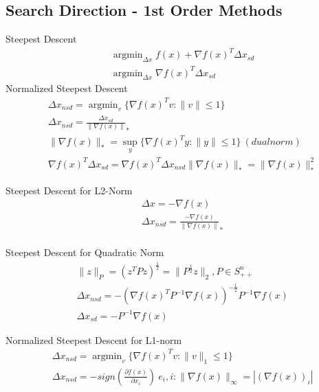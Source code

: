 \documentclass[8pt]{report}
\DeclareMathOperator*{\argmin}{argmin}
\newcommand{\norm}[1]{\|#1\|}
\newcommand{\set}[1]{\{#1\}}
\begin{document}
\begin{multicols*}{2}
  \vfill\null
  \columnbreak
  
  \subsection{Search Direction - 1st Order Methods}
  Steepest Descent
  \begin{align*}
    &\argmin_{\Delta x} f(x) + \nabla f(x)^T \Delta x_{sd}\\
    &\argmin_{\Delta x} \nabla f(x)^T \Delta x_{sd}
  \end{align*}
  Normalized Steepest Descent
  \begin{align*}
    &\Delta x_{nsd} = \argmin_{v} \set{ \nabla f(x)^T v : \norm{v} \leq 1 }\\
    &\Delta x_{nsd} = \frac{\Delta x_{sd}}{\norm{\nabla f(x)}}_*\\
    &\norm{\nabla f(x)}_* = \sup_y \{\nabla f(x)^T y: \|y\| \leq 1 \}\ (dual norm)\\
    &\nabla f(x)^T \Delta x_{sd} = \nabla f(x)^T \Delta x_{nsd} \norm{\nabla f(x)}_* = \norm{\nabla f(x)}_*^2
  \end{align*}

  Steepest Descent for L2-Norm
  \begin{align*}
    &\Delta x = -\nabla f(x)\\
    &\Delta x_{nsd} = \frac{-\nabla f(x)}{\norm{\nabla f(x)}}_*\\
  \end{align*}
  
  Steepest Descent for Quadratic Norm
  \begin{align*}
    &\norm{z}_P = (z^TPz)^{\frac{1}{2}} = \norm{P^{\frac{1}{2}}z}_2, P \in S_{++}^n\\
    &\Delta x_{nsd} = -(\nabla f(x)^T P^{-1} \nabla f(x))^{-\frac{1}{2}} P^{-1} \nabla f(x)\\
    &\Delta x_{sd} = -P^{-1} \nabla f(x)
  \end{align*}

  Normalized Steepest Descent for L1-norm
  \begin{align*}
    &\Delta x_{nsd} = \argmin_{v} \set{ \nabla f(x)^T v : \norm{v}_1 \leq 1 }\\
    &\Delta x_{nsd} = - sign (\frac{\partial f(x)}{\partial x_i})\ e_i, i: \norm{\nabla f(x)}_{\infty} = |(\nabla f(x))_i|
  \end{align*}
  \vfill\null  
  \pagebreak
  

\end{multicols*}
\end{document}
